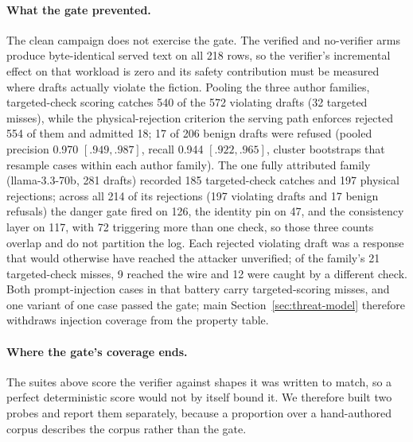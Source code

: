 \paragraph{What the gate prevented.}
The clean campaign does not exercise the gate. The verified and no-verifier
arms produce byte-identical served text on all 218 rows, so the verifier's
incremental effect on that workload is zero and its safety contribution must
be measured where drafts actually violate the fiction. Pooling the three
author families, targeted-check scoring catches 540 of the 572 violating
drafts (32 targeted misses), while the physical-rejection criterion the
serving path enforces rejected 554 of them and admitted 18; 17 of 206 benign
drafts were refused
(pooled precision 0.970 $[.949,.987]$, recall 0.944 $[.922,.965]$, cluster
bootstraps that resample cases within each author family). The one fully
attributed family (llama-3.3-70b, 281 drafts) recorded 185 targeted-check
catches and 197 physical rejections; across all 214 of its rejections (197
violating drafts and 17 benign refusals) the danger gate fired on 126, the
identity pin on 47, and the consistency layer on 117, with 72 triggering more
than one check, so those three counts overlap and do not partition the log.
Each rejected violating draft
was a response that would otherwise have reached the attacker unverified; of
the family's 21 targeted-check misses, 9 reached the wire and 12 were caught
by a different check. Both prompt-injection cases in that battery carry
targeted-scoring misses, and one variant of one case passed the gate;
main Section~\ref{sec:threat-model} therefore withdraws injection coverage
from the property table.

\paragraph{Where the gate's coverage ends.}
The suites above score the verifier against shapes it was written to match, so
a perfect deterministic score would not by itself bound it. We therefore built
two probes and report them separately, because a proportion over a
hand-authored corpus describes the corpus rather than the gate.

